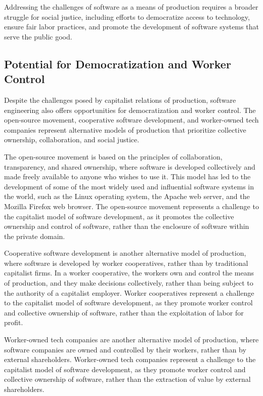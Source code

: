 \begin{refsection}
\begin{multicols}{2}
{Addressing the challenges of software as a means of production requires a broader struggle for social justice, including efforts to democratize access to technology, ensure fair labor practices, and promote the development of software systems that serve the public good.

\subsection{Potential for Democratization and Worker Control}

Despite the challenges posed by capitalist relations of production, software engineering also offers opportunities for democratization and worker control. The open-source movement, cooperative software development, and worker-owned tech companies represent alternative models of production that prioritize collective ownership, collaboration, and social justice.

The open-source movement is based on the principles of collaboration, transparency, and shared ownership, where software is developed collectively and made freely available to anyone who wishes to use it. This model has led to the development of some of the most widely used and influential software systems in the world, such as the Linux operating system, the Apache web server, and the Mozilla Firefox web browser. The open-source movement represents a challenge to the capitalist model of software development, as it promotes the collective ownership and control of software, rather than the enclosure of software within the private domain.

Cooperative software development is another alternative model of production, where software is developed by worker cooperatives, rather than by traditional capitalist firms. In a worker cooperative, the workers own and control the means of production, and they make decisions collectively, rather than being subject to the authority of a capitalist employer. Worker cooperatives represent a challenge to the capitalist model of software development, as they promote worker control and collective ownership of software, rather than the exploitation of labor for profit.

Worker-owned tech companies are another alternative model of production, where software companies are owned and controlled by their workers, rather than by external shareholders. Worker-owned tech companies represent a challenge to the capitalist model of software development, as they promote worker control and collective ownership of software, rather than the extraction of value by external shareholders.

}
\end{multicols}
\end{refsection}
